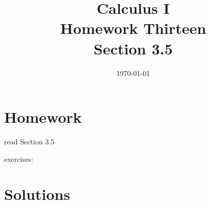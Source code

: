 \documentclass[letterpaper, landscape]{exam}
\title{Calculus I \\ Homework Thirteen \\ Section 3.5}
\author{}
\date{\today}
\begin{document}
  \maketitle

  \section{Homework}
    \begin{itemize*}
      \item read Section 3.5
      \item exercises: 
    \end{itemize*}

  \ifprintanswers

  \section{Solutions}
\end{document}
